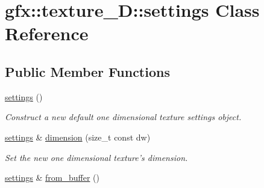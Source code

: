 \hypertarget{classgfx_1_1texture__1D_1_1settings}{\section{gfx\-:\-:texture\-\_\-D\-:\-:settings Class Reference}
\label{classgfx_1_1texture__1D_1_1settings}
}
\subsection*{Public Member Functions}
\begin{DoxyCompactItemize}
\item 
\hyperlink{classgfx_1_1texture__1D_1_1settings_a4d29f6a958781c7ea57ed5b0cc107dad}{settings} ()
\begin{DoxyCompactList}\small\item\em Construct a new default one dimensional texture settings object. \end{DoxyCompactList}\item 
\hyperlink{classgfx_1_1texture__1D_1_1settings}{settings} \& \hyperlink{classgfx_1_1texture__1D_1_1settings_ae9e29de2714a6324238f0313f24ce36d}{dimension} (size\-\_\-t const dw)
\begin{DoxyCompactList}\small\item\em Set the new one dimensional texture's dimension. \end{DoxyCompactList}\item 
\hypertarget{classgfx_1_1texture__1D_1_1settings_a1b743fa7038545efe82b96e747d1525e}{\hyperlink{classgfx_1_1texture__1D_1_1settings}{settings} \& \hyperlink{classgfx_1_1texture__1D_1_1settings_a1b743fa7038545efe82b96e747d1525e}{from\-\_\-buffer} ()}\label{classgfx_1_1texture__1D_1_1settings_a1b743fa7038545efe82b96e747d1525e}


\end{DoxyCompactItemize}

